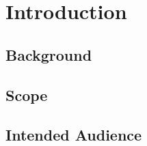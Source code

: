

\setcounter{section}{0}
\section{Introduction}
\bigskip

\subsection{Background}

\subsection{Scope}

\subsection{Intended Audience}
















